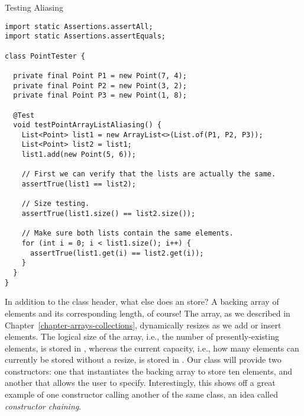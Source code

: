 \begin{cl}[]{Testing  Aliasing}
\begin{lstlisting}[language=MyJava]
import static Assertions.assertAll;
import static Assertions.assertEquals;

class PointTester {

  private final Point P1 = new Point(7, 4);
  private final Point P2 = new Point(3, 2);
  private final Point P3 = new Point(1, 8);

  @Test
  void testPointArrayListAliasing() {
    List<Point> list1 = new ArrayList<>(List.of(P1, P2, P3));
    List<Point> list2 = list1;
    list1.add(new Point(5, 6));

    // First we can verify that the lists are actually the same.
    assertTrue(list1 == list2);

    // Size testing.
    assertTrue(list1.size() == list2.size());

    // Make sure both lists contain the same elements.
    for (int i = 0; i < list1.size(); i++) {
      assertTrue(list1.get(i) == list2.get(i));
    }
  }
}
\end{lstlisting}
\end{cl}


In addition to the class header, what else does an  store? A backing array of elements and its corresponding length, of course! The array, as we described in Chapter~\ref{chapter-arrays-collections}, dynamically resizes as we add or insert elements. The logical size of the array, i.e., the number of presently-existing elements, is stored in , whereas the current capacity, i.e., how many elements can currently be stored without a resize, is stored in . Our class will provide two constructors: one that instantiates the backing array to store ten elements, and another that allows the user to specify. Interestingly, this shows off a great example of one constructor calling another of the same class, an idea called \textit{constructor chaining}. 

